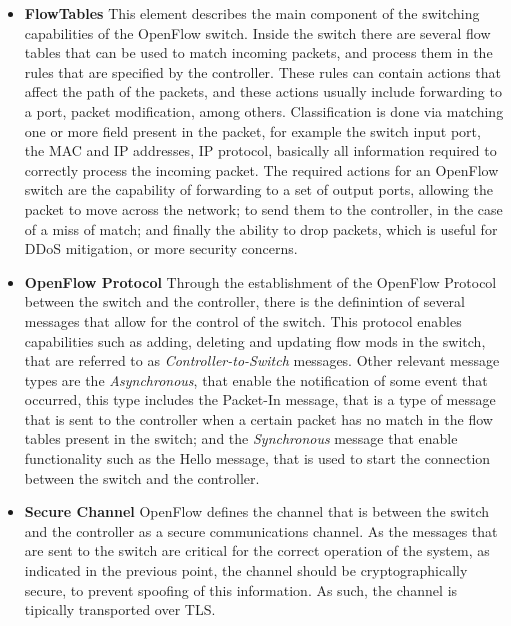 \begin {itemize}
    \item \textbf {FlowTables} This element describes the main component of the switching capabilities of the OpenFlow switch. Inside the switch there are several flow tables that can be used to match incoming packets,
and process them in the rules that are specified by the controller. These rules can contain actions that affect the path of the packets, and these actions usually include forwarding to a port, packet modification, among
others. Classification is done via matching one or more field present in the packet, for example the switch input port, the MAC and IP addresses, IP protocol, basically all information required to correctly process the 
incoming packet. The required actions for an OpenFlow switch are the capability of forwarding to a set of output ports, allowing the packet to move across the network; to send them to the controller, in the case of a
miss of match; and finally the ability to drop packets, which is useful for DDoS mitigation, or more security concerns.
    \item \textbf {OpenFlow Protocol} Through the establishment of the OpenFlow Protocol between the switch and the controller, there is the definintion of several messages that allow for the control of the switch. This protocol
enables capabilities such as adding, deleting and updating flow mods in the switch, that are referred to as \textit {Controller-to-Switch} messages. Other relevant message types are the \textit {Asynchronous}, that enable the
notification of some event that occurred, this type includes the Packet-In message, that is a type of message that is sent to the controller when a certain packet has no match in the flow tables present in the switch; and the 
\textit{ Synchronous} message that enable functionality such as the Hello message, that is used to start the connection between the switch and the controller.
    \item \textbf {Secure Channel} OpenFlow defines the channel that is between the switch and the controller as a secure communications channel. As the messages that are sent to the switch are critical for the correct operation 
of the system, as indicated in the previous point, the channel should be cryptographically secure, to prevent spoofing of this information. As such, the channel is tipically transported over TLS.
\end {itemize}

